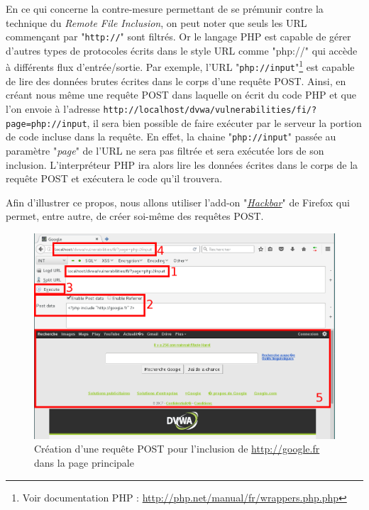 En ce qui concerne la contre-mesure permettant de se prémunir contre la technique du \textit{Remote File Inclusion}, on peut noter que seuls les URL commençant par "\texttt{http://}" sont filtrés. Or le langage PHP est capable de gérer d'autres types de protocoles écrits dans le style URL comme "php://" qui accède à différents flux d'entrée/sortie. Par exemple, l'URL "\texttt{php://input}"\footnote{Voir documentation PHP : \url{http://php.net/manual/fr/wrappers.php.php}} est capable de lire des données brutes écrites dans le corps d'une requête POST. Ainsi, en créant nous même une requête POST dans laquelle on écrit du code PHP et que l'on envoie à l'adresse \texttt{http://localhost/dvwa/vulnerabilities/fi/?page=php://input}, il sera bien possible de faire exécuter par le serveur la portion de code incluse dans la requête. En effet, la chaine "\texttt{php://input}" passée au paramètre "\textit{page}" de l'URL ne sera pas filtrée et sera exécutée lors de son inclusion. L'interpréteur PHP ira alors lire les données écrites dans le corps de la requête POST et exécutera le code qu'il trouvera.

Afin d'illustrer ce propos, nous allons utiliser l'add-on "\href{https://addons.mozilla.org/fr/firefox/addon/hackbar/}{\textit{Hackbar}}" de Firefox qui permet, entre autre, de créer soi-même des requêtes POST.


\begin{figure}[!h]
\begin{center}
\includegraphics[scale=.41]{images/fi6.png}

\caption{Création d'une requête POST pour l'inclusion de \url{http://google.fr} dans la page principale}
\label{fi_dvwa6}
\end{center}
\end{figure}



